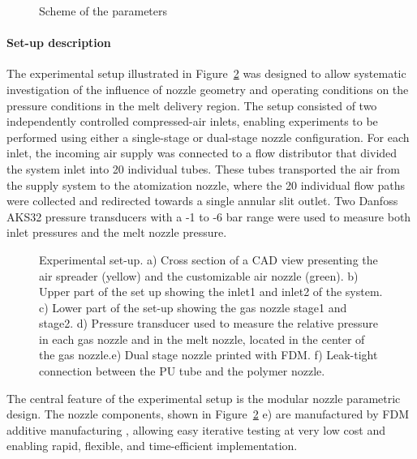 \documentclass[../../main.tex]{subfiles}
\begin{document}
\vspace{0mm}
\begin{figure}[H]
    \centering
        
        \caption{Scheme of the parameters}
        \label{f:parameters_scheme}
\end{figure}
\FloatBarrier
\vspace{0mm}

\paragraph{Set-up description}

The experimental setup illustrated in Figure~\ref{f:set-up} was designed to allow systematic investigation of the influence of nozzle geometry and operating conditions on the pressure conditions in the melt delivery region. The setup consisted of two independently controlled compressed-air inlets, enabling experiments to be performed using either a single-stage or dual-stage nozzle configuration. For each inlet, the incoming air supply was connected to a flow distributor that divided the system inlet into 20 individual tubes. These tubes transported the air from the supply system to the atomization nozzle, where the 20 individual flow paths were collected and redirected towards a single annular slit outlet. Two Danfoss AKS32 pressure transducers with a -1 to -6 bar range were used to measure both inlet pressures and the melt nozzle pressure.

\begin{figure}[H]
    \centering
        
        \caption[Experimental set-up]{Experimental set-up. a) Cross section of a CAD view presenting the air spreader (yellow) and the customizable air nozzle (green). b) Upper part of the set up showing the inlet1 and inlet2 of the system. c) Lower part of the set-up showing the gas nozzle stage1 and stage2. d) Pressure transducer used to measure the relative pressure in each gas nozzle and in the melt nozzle, located in the center of the gas nozzle.e) Dual stage nozzle printed with FDM. f) Leak-tight connection between the PU tube and the polymer nozzle.}
        \label{f:set-up}
\end{figure}

The central feature of the experimental setup is the modular nozzle parametric design. The nozzle components, shown in Figure~\ref{f:set-up} e) are manufactured by FDM additive manufacturing \cite{Cano-Vicent2021FusedDeposition}, allowing easy iterative testing at very low cost and enabling rapid, flexible, and time-efficient implementation.
\end{document}
